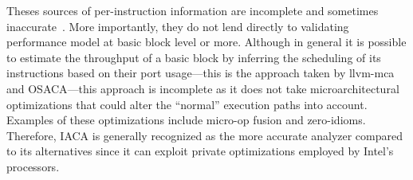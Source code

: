 Theses sources of per-instruction information are incomplete and sometimes inaccurate~\cite{uops}. 
More importantly, they do not lend directly to validating performance model at basic block level or more.
Although in general it is possible to estimate the throughput of 
a basic block by inferring the scheduling of its instructions based on their
port usage---this is the approach taken by llvm-mca~\cite{llvm-mca} and OSACA\cite{osaca}---this
approach is incomplete as it does not take microarchitectural
optimizations that could alter the ``normal'' execution paths into account. 
Examples of these optimizations include micro-op fusion and zero-idioms.
Therefore, IACA\cite{iaca} is generally recognized as the more accurate analyzer
compared to its alternatives since it can exploit
private optimizations employed by Intel's processors.


